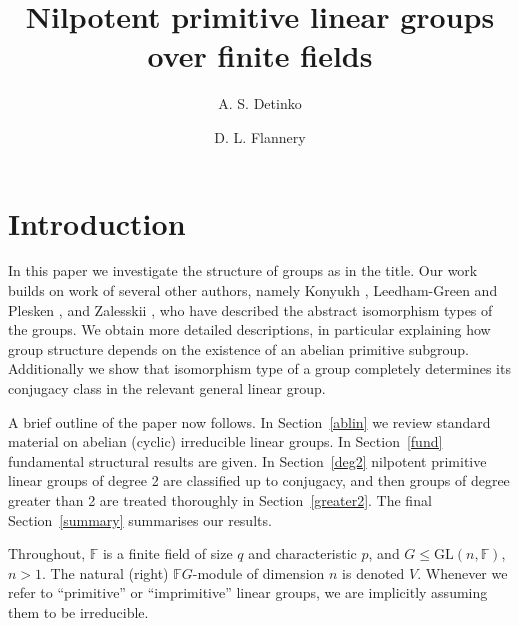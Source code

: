 \documentclass[12pt]{amsart}
\theoremstyle{definition}
\theoremstyle{remark}
\begin{document}


\title{Nilpotent primitive linear groups over finite fields}



\author{A. S. Detinko}
\address{ Department of Computer Science,
School of Computing and Engineering,
University of Huddersfield, Queensgate,
Huddersfield
HD1 3DH, UK}
\author{D. L. Flannery}
\address{Department of Mathematics, University
 of Galway, Galway H91 TK33, Ireland}

\maketitle



\section{Introduction}

 In this paper we investigate the structure
 of groups as in the title. Our work builds on work of
 several other authors, namely Konyukh \cite{Konyuh},
 Leedham-Green and Plesken \cite{LGP}, 
 and  Zalesskii \cite{Zalesskii}, who  have described 
 the abstract isomorphism types of the groups. We obtain 
 more detailed descriptions, in particular
 explaining how group structure depends on the existence 
 of an abelian primitive 
 subgroup. Additionally we show that isomorphism
 type of a group completely determines its 
 conjugacy class in the relevant general linear group.

 A  brief outline of the paper now follows.
 In Section~\ref{ablin} we review standard material on
 abelian (cyclic) irreducible linear groups.
 In Section~\ref{fund} fundamental structural results are 
 given. In Section~\ref{deg2} nilpotent primitive linear 
 groups of degree 2 are classified up to conjugacy, 
 and then groups of degree greater than 2 are treated 
 thoroughly in Section~\ref{greater2}. 
 The final Section~\ref{summary} summarises our results. 

 Throughout, $\mathbb{F}$ is a finite field of size $q$ and 
 characteristic $p$, and $G \leq \mathrm{GL}(n,\mathbb{F})$,
 $n>1$. The natural (right) $\mathbb{F}G$-module 
 of dimension $n$ is denoted $V$. Whenever we
 refer to  ``primitive'' or ``imprimitive'' 
 linear groups, we are implicitly assuming 
 them to be irreducible.
%
\end{document}
